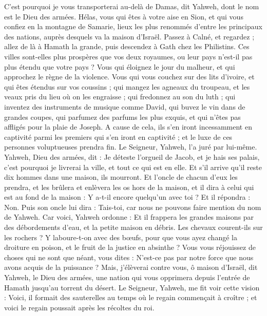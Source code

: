 \begin{multicols}{2}
C'est pourquoi je vous transporterai au-delà de Damas, dit Yahweh, dont le nom est le Dieu des armées.
\VerseOne{}Hélas, vous qui êtes à votre aise en Sion, et qui vous confiez en la montagne de Samarie, lieux les plus renommés d'entre les principaux des nations, auprès desquels va la maison d'Israël.
Passez à Calné, et regardez ; allez de là à Hamath la grande, puis descendez à Gath chez les Philistins. Ces villes sont-elles plus prospères que vos deux royaumes, ou leur pays n'est-il pas plus étendu que votre pays ?
Vous qui éloignez le jour du malheur, et qui approchez le règne de la violence.
Vous qui vous couchez sur des lits d'ivoire, et qui êtes étendus sur vos coussins ; qui mangez les agneaux du troupeau, et les veaux pris du lieu où on les engraisse ;
qui fredonnez au son du luth ; qui inventez des instruments de musique comme David,
qui buvez le vin dans de grandes coupes, qui parfumez des parfums les plus exquis, et qui n'êtes pas affligés pour la plaie de Joseph.
A cause de cela, ils s'en iront incessamment en captivité parmi les premiers qui s'en iront en captivité ; et le luxe de ces personnes voluptueuses prendra fin. 
Le Seigneur, Yahweh, l'a juré par lui-même. Yahweh, Dieu des armées, dit : Je déteste l'orgueil de Jacob, et je hais ses palais, c'est pourquoi je livrerai la ville, et tout ce qui est en elle.
Et s'il arrive qu'il reste dix hommes dans une maison, ils mourront.
Et l'oncle de chacun d'eux les prendra, et les brûlera et enlèvera les os hors de la maison, et il dira à celui qui est au fond de la maison : Y a-t-il encore quelqu'un avec toi ? Et il répondra : Non. Puis son oncle lui dira : Tais-toi, car nous ne pouvons faire mention du nom de Yahweh.
Car voici, Yahweh ordonne : Et il frappera les grandes maisons par des débordements d'eau, et la petite maison en débris.
Les chevaux courent-ils sur les rochers ? Y laboure-t-on avec des bœufs, pour que vous ayez changé la droiture en poison, et le fruit de la justice en absinthe ?
Vous vous réjouissez de choses qui ne sont que néant, vous dites : N'est-ce pas par notre force que nous avons acquis de la puissance ?
Mais, j'élèverai contre vous, ô maison d'Israël, dit Yahweh, le Dieu des armées, une nation qui vous opprimera depuis l'entrée de Hamath jusqu'au torrent du désert.
\VerseOne{}Le Seigneur, Yahweh, me fit voir cette vision : Voici, il formait des sauterelles au temps où le regain commençait à croître ; et voici le regain poussait après les récoltes du roi.

\end{multicols}
